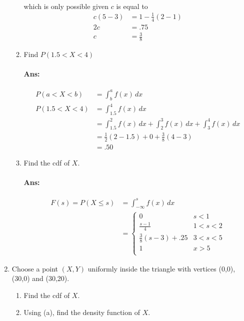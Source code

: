 \documentclass[letterpaper,12pt]{article}
\begin{document}
\begin{enumerate}
\begin{enumerate}[label=(\alph*).]
            \paragraph{}which is only possible given $c$ is equal to
            \begin{align*}
                c(5-3) &= 1 - \frac{1}{4}(2-1)\\
                2c &= .75\\
                 c &= \frac{3}{8}
            \end{align*}
        \item Find $P(1.5 < X < 4)$
            \paragraph{Ans:}
            \begin{align*}
                P(a < X < b) &= \int_b^a f(x)\,dx\\
                P(1.5 < X < 4) &= \int_{1.5}^4 f(x)\,dx\\
                               &= \int_{1.5}^2 f(x)\,dx + \int_2^3 f(x)\,dx+\int_3^4 f(x)\,dx\\
                               &= \frac{1}{2}(2-1.5) + 0 + \frac{3}{8}(4-3)\\
                               &= .50
            \end{align*}
        \item Find the cdf of $X$.
            \paragraph{Ans:}
            \begin{align*}
                F(s) = P(X\le s) &= \int_{-\infty}^s f(x)\,dx\\
                                 &= \begin{cases}
                                     0 & s < 1 \\
                                     \frac{s-1}{4} & 1 < s < 2 \\
                                     \frac{3}{8}(s-3)+.25 & 3 < s < 5 \\
                                     1 & x > 5 \\
                                     \end{cases}
            \end{align*}
    \end{enumerate}
\item Choose a point $(X,Y )$ uniformly inside the triangle with vertices (0,0), (30,0) and
(30,20).
\begin{enumerate}[label=(\alph*).]
    \item Find the cdf of $X$.

    \item Using (a), find the density function of $X$.
\end{enumerate}
\end{enumerate}
\end{document}
